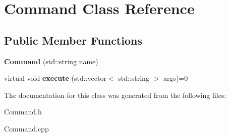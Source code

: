 \hypertarget{classCommand}{}\section{Command Class Reference}
\label{classCommand}
\subsection*{Public Member Functions}
\begin{DoxyCompactItemize}
\item 
\mbox{\label{classCommand_a14139b6d8df5b46a07cf1cdc990c8ec3}} 
{\bfseries Command} (std\+::string name)
\item 
\mbox{\label{classCommand_a5914e93f56b0de850e6443314b771f50}} 
virtual void {\bfseries execute} (std\+::vector$<$ std\+::string $>$ args)=0
\end{DoxyCompactItemize}


The documentation for this class was generated from the following files\+:\begin{DoxyCompactItemize}
\item 
Command.\+h\item 
Command.\+cpp\end{DoxyCompactItemize}
